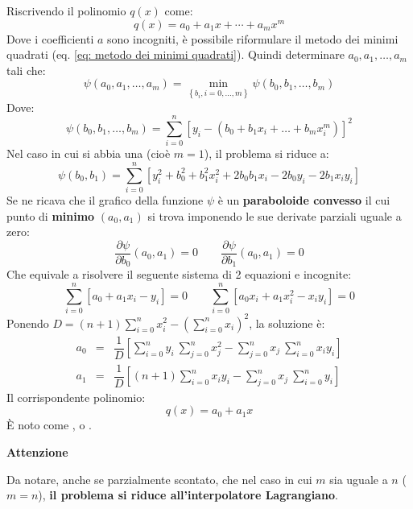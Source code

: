 \highspace
Riscrivendo il polinomio $q\left(x\right)$ come:
\begin{equation*}
	q\left(x\right) = a_{0} + a_{1}x + \cdots + a_{m}x^{m}
\end{equation*}
Dove i coefficienti $a$ sono incogniti, è possibile riformulare il metodo dei minimi quadrati (eq. \ref{eq: metodo dei minimi quadrati}). Quindi determinare $a_{0}, a_{1}, \dots, a_{m}$ tali che:
\begin{equation*}
	\psi\left(a_{0}, a_{1}, \dots, a_{m}\right) = \underset{\left\{b_{i}, i = 0, \dots, m\right\}}{\min} \psi\left(b_{0}, b_{1}, \dots, b_{m}\right)
\end{equation*}
Dove:
\begin{equation*}
	 \psi\left(b_{0}, b_{1}, \dots, b_{m}\right) = \displaystyle\sum_{i=0}^{n} \left[y_{i} - \left(b_{0} + b_{1}x_{i} + \dots + b_{m}x_{i}^{m}\right)\right]^{2}
\end{equation*}
Nel caso in cui si abbia una  (cioè $m = 1$), il problema si riduce a:
\begin{equation*}
	\psi\left(b_{0}, b_{1}\right) = \displaystyle\sum_{i=0}^{n} \left[y_{i}^{2} + b_{0}^{2} + b_{1}^{2}x_{i}^{2} + 2b_{0}b_{1}x_{i} - 2b_{0}y_{i} - 2b_{1}x_{i}y_{i}\right]
\end{equation*}
Se ne ricava che il grafico della funzione $\psi$ è un \textbf{paraboloide convesso} il cui punto di \textbf{minimo} $\left(a_{0}, a_{1}\right)$ si trova imponendo le sue derivate parziali uguale a zero:
\begin{equation*}
	\dfrac{\partial \psi}{\partial b_{0}}\left(a_{0}, a_{1}\right) = 0 \hspace{2em} \dfrac{\partial \psi}{\partial b_{1}}\left(a_{0}, a_{1}\right) = 0
\end{equation*}
Che equivale a risolvere il seguente sistema di 2 equazioni e incognite:
\begin{equation*}
	\displaystyle \sum_{i=0}^{n} \left[a_{0} + a_{1}x_{i} - y_{i}\right] = 0 \hspace{2em} \displaystyle \sum_{i=0}^{n} \left[a_{0}x_{i} + a_{1}x_{i}^{2} - x_{i}y_{i}\right] = 0
\end{equation*}
Ponendo $D=\left(n+1\right)\displaystyle\sum_{i=0}^{n} x_{i}^{2} - \left(\displaystyle\sum_{i=0}^{n} x_{i}\right)^{2}$, la soluzione è:
\begin{equation*}
	\begin{array}{rcl}
		a_{0} &=& \dfrac{1}{D} \left[\displaystyle\sum_{i=0}^{n} y_{i} \: \displaystyle\sum_{j=0}^{n}x_{j}^{2} - \displaystyle\sum_{j=0}^{n} x_{j} \: \displaystyle\sum_{i=0}^{n}x_{i}y_{i} \right] \\ [2em]
		a_{1} &=& \dfrac{1}{D} \left[\left(n+1\right)\displaystyle\sum_{i=0}^{n}x_{i}y_{i} - \displaystyle\sum_{j=0}^{n}x_{j} \: \sum_{i=0}^{n}y_{i} \right]
	\end{array}
\end{equation*}
Il corrispondente polinomio:
\begin{equation}
	q\left(x\right) = a_{0} + a_{1}x
\end{equation}
È noto come , o .

\highspace
\begin{flushleft}
	\textcolor{Red2}{ \textbf{Attenzione}}
\end{flushleft}
Da notare, anche se parzialmente scontato, che nel caso in cui $m$ sia uguale a $n$ ($m=n$), \textbf{il problema si riduce all'interpolatore Lagrangiano}.